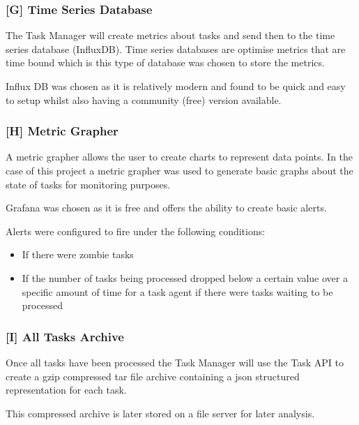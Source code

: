 \documentclass{mscreport}
\begin{document}
\subsubsection{[G] Time Series Database}

The Task Manager will create metrics about tasks and send then to the time series database (InfluxDB). Time series databases are optimise metrics that are time bound which is this type of database was chosen to store the metrics.

\vspace{0.3cm} \noindent
Influx DB was chosen as it is relatively modern and found to be quick and easy to setup whilst also having a community (free) version available.

\subsubsection{[H] Metric Grapher}

A metric grapher allows the user to create charts to represent data points. In the case of this project a metric grapher was used to generate basic graphs about the state of tasks for monitoring purposes.

\vspace{0.3cm} \noindent
Grafana was chosen as it is free and offers the ability to create basic alerts.

\vspace{0.3cm} \noindent
Alerts were configured to fire under the following conditions:

\begin{itemize}
	\setlength\itemsep{0.1em}
    \item If there were zombie tasks
    \item If the number of tasks being processed dropped below a certain value over a specific amount of time for a task agent if there were tasks waiting to be processed
\end{itemize}

\subsubsection{[I] All Tasks Archive}

Once all tasks have been processed the Task Manager will use the Task API to create a gzip compressed tar file archive containing a json structured representation for each task.

\vspace{0.3cm} \noindent
This compressed archive is later stored on a file server for later analysis.
\end{document}
